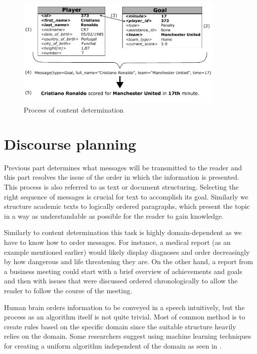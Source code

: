 \begin{figure}[h]
	\centerline{\includegraphics[width=0.9\textwidth]{./img/content_determination.pdf}}
	\caption{Process of content determination}
	\label{fig:cd}
\end{figure}

\section{Discourse planning}
Previous part determines what messages will be transmitted to the reader and this part resolves the issue of the order in which the information is presented. This process is also referred to as text or document structuring. Selecting the right sequence of messages is crucial for text to accomplish its goal. Similarly we structure academic texts to logically ordered paragraphs, which present the topic in a way as understandable as possible for the reader to gain knowledge.

Similarly to content determination this task is highly domain-dependent as we have to know how to order messages. For instance, a medical report (as an example mentioned earlier) would likely display diagnoses and order decreasingly by how dangerous and life threatening they are. On the other hand, a report from a business meeting could start with a brief overview of achievements and goals and then with issues that were discussed ordered chronologically to allow the reader to follow the course of the meeting.

Human brain orders information to be conveyed in a speech intuitively, but the process as an algorithm itself is not quite trivial. Most of common method is to create rules based on the specific domain since the suitable structure heavily relies on the domain. Some researchers suggest using machine learning techniques for creating a  uniform algorithm independent of the domain as seen in \cite{dimitromanolaki2003learning}.

